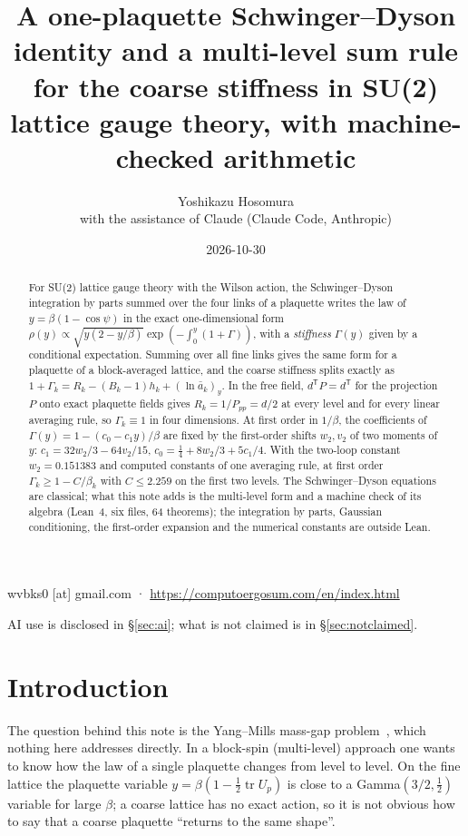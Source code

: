 \documentclass[11pt,a4paper]{article}
\title{A one-plaquette Schwinger--Dyson identity and a multi-level sum rule for the coarse stiffness in SU(2) lattice gauge theory, with machine-checked arithmetic}
\author{Yoshikazu Hosomura\\[.3em]\normalsize with the assistance of Claude (Claude Code, Anthropic)}
\date{2026-10-30}
\theoremstyle{definition}
\theoremstyle{remark}
\newcommand{\abar}{\bar a}
\begin{document}
\maketitle
\begin{center}\small wvbks0 [at] gmail.com · \url{https://computoergosum.com/en/index.html}\end{center}
\begin{center}\small AI use is disclosed in \S\ref{sec:ai}; what is not claimed is in \S\ref{sec:notclaimed}.\end{center}

\begin{abstract}
For SU(2) lattice gauge theory with the Wilson action, the Schwinger--Dyson integration by parts summed over the four links of a plaquette writes the law of $y=\beta(1-\cos\psi)$ in the exact one-dimensional form $\rho(y)\propto\sqrt{y(2-y/\beta)}\exp(-\int_0^y(1+\Gamma))$, with a \emph{stiffness} $\Gamma(y)$ given by a conditional expectation. Summing over all fine links gives the same form for a plaquette of a block-averaged lattice, and the coarse stiffness splits exactly as $1+\Gamma_k=R_k-(B_k-1)h_k+(\ln\abar_k)_y$. In the free field, $d^{\mathsf T}P=d^{\mathsf T}$ for the projection $P$ onto exact plaquette fields gives $R_k=1/P_{pp}=d/2$ at every level and for every linear averaging rule, so $\Gamma_k\equiv1$ in four dimensions. At first order in $1/\beta$, the coefficients of $\Gamma(y)=1-(c_0-c_1y)/\beta$ are fixed by the first-order shifts $w_2,v_2$ of two moments of $y$: $c_1=32w_2/3-64v_2/15$, $c_0=\tfrac14+8w_2/3+5c_1/4$. With the two-loop constant $w_2=0.151383$ and computed constants of one averaging rule, at first order $\Gamma_k\ge1-C/\beta_k$ with $C\le2.259$ on the first two levels. The Schwinger--Dyson equations are classical; what this note adds is the multi-level form and a machine check of its algebra (Lean~4, six files, 64 theorems); the integration by parts, Gaussian conditioning, the first-order expansion and the numerical constants are outside Lean.
\end{abstract}

\section{Introduction}\label{sec:intro}

The question behind this note is the Yang--Mills mass-gap problem~\cite{JW}, which nothing here addresses directly. In a block-spin (multi-level) approach one wants to know how the law of a single plaquette changes from level to level. On the fine lattice the plaquette variable $y=\beta(1-\tfrac12\operatorname{tr}U_p)$ is close to a Gamma$(3/2,\tfrac12)$ variable for large $\beta$; a coarse lattice has no exact action, so it is not obvious how to say that a coarse plaquette ``returns to the same shape''.
\end{document}
